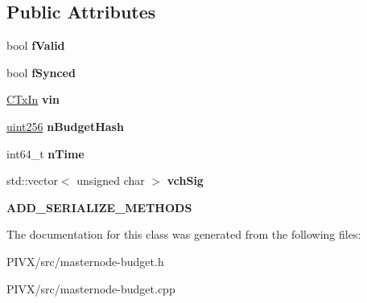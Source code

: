 \subsection*{Public Attributes}
\begin{DoxyCompactItemize}
\item 
\mbox{\label{class_c_finalized_budget_vote_aef317580b2f8a41d739e825acbdbb04a}} 
bool {\bfseries f\+Valid}
\item 
\mbox{\label{class_c_finalized_budget_vote_acf10705c636a83d7b1a45404a0195902}} 
bool {\bfseries f\+Synced}
\item 
\mbox{\label{class_c_finalized_budget_vote_adcfb3d5520f8374deac4f3b4f6eb24cc}} 
\mbox{\hyperlink{class_c_tx_in}{C\+Tx\+In}} {\bfseries vin}
\item 
\mbox{\label{class_c_finalized_budget_vote_a2aec1fb12151d1c028e755e20f452272}} 
\mbox{\hyperlink{classuint256}{uint256}} {\bfseries n\+Budget\+Hash}
\item 
\mbox{\label{class_c_finalized_budget_vote_abe49a15e472fdaaab521ae83bb9f6e42}} 
int64\+\_\+t {\bfseries n\+Time}
\item 
\mbox{\label{class_c_finalized_budget_vote_a8068f2ad5defbc62be4221ecacef011f}} 
std\+::vector$<$ unsigned char $>$ {\bfseries vch\+Sig}
\item 
\mbox{\label{class_c_finalized_budget_vote_a3f53b91508d16154326dc743775cf5e9}} 
{\bfseries A\+D\+D\+\_\+\+S\+E\+R\+I\+A\+L\+I\+Z\+E\+\_\+\+M\+E\+T\+H\+O\+DS}
\end{DoxyCompactItemize}


The documentation for this class was generated from the following files\+:\begin{DoxyCompactItemize}
\item 
P\+I\+V\+X/src/masternode-\/budget.\+h\item 
P\+I\+V\+X/src/masternode-\/budget.\+cpp\end{DoxyCompactItemize}
